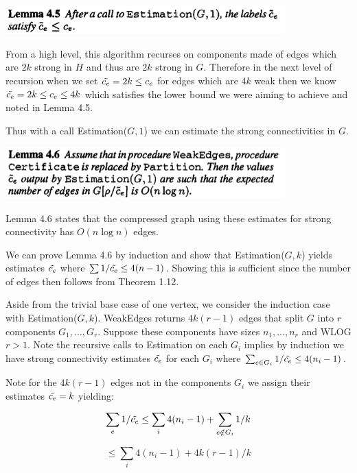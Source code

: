 \documentclass[11pt]{article}
\begin{document}
\begin{center}
\includegraphics[width=0.8\textwidth]{figures/Lemma4_5.png}
\end{center}

From a high level, this algorithm recurses on components made of edges which are $2k$ strong in $H$ and thus are $2k$ strong in $G$. Therefore in the next level of recursion when we set $\Tilde{c_e} = 2k \le c_e$ for edges which are $4k$ weak then we know $\Tilde{c_e} = 2k \le c_e \le 4k$ which satisfies the lower bound we were aiming to achieve and noted in Lemma 4.5.

Thus with a call Estimation($G, 1$) we can estimate the strong connectivities in $G$.

\begin{center}
\includegraphics[width=0.8\textwidth]{figures/Lemma4_6.png}
\end{center}

Lemma 4.6 states that the compressed graph using these estimates for strong connectivity has $O(n\log n)$ edges.

We can prove Lemma 4.6 by induction and show that Estimation($G, k$) yields estimates $\Tilde{c_e}$ where $\sum{1/\Tilde{c_e}} \le 4(n-1)$. Showing this is sufficient since the number of edges then follows from Theorem 1.12. 

Aside from the trivial base case of one vertex, we consider the induction case with Estimation($G, k$). WeakEdges returns $4k(r-1)$ edges that split $G$ into $r$ components $G_1, ... , G_r$. Suppose these components have sizes $n_1, ..., n_r$ and WLOG $r > 1$. Note the recursive calls to Estimation on each $G_i$ implies by induction we have strong connectivity estimates $\Tilde{c_e}$ for each $G_i$ where $\sum_{e \in G_i}{1/\Tilde{c_e}} \le 4(n_i - 1)$. 

Note for the $4k(r-1)$ edges not in the components $G_i$ we assign their estimates $\Tilde{c_e} = k$ yielding: 

\[
\sum_e{1/\Tilde{c_e}} \le \sum_i{4(n_i - 1)} + \sum_{e \notin G_i}{1/k}
\]

\[
\le \sum_i{4(n_i - 1)} + 4k(r-1)/k
\]
\end{document}
